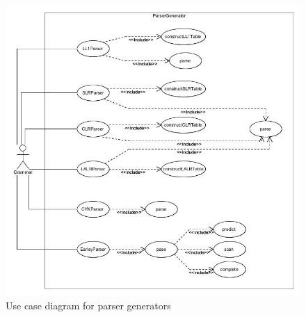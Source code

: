 \documentclass{beamer}
\begin{document}
  \begin{frame}
\begin{figure}
\includegraphics[height=0.8\textheight]{ParserGenerators.jpg}
\caption{Use case diagram for parser generators}
\label{fig: pg}
\end{figure}
 \end{frame}
 
\end{document}
